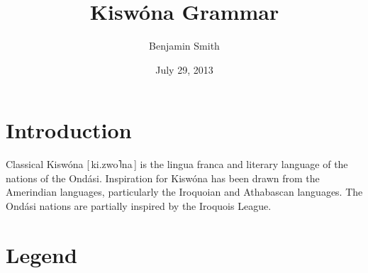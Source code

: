 \documentclass[11pt,a4paper,titlepage]{article}
\author{Benjamin Smith}
\title{Kiswóna Grammar}
\date{July 29, 2013}
\newcommand\phone[1]{[\,#1\,]}
\newcommand\hightone{˥}
\begin{document}
	

	\tableofcontents
	
	\newpage
	
	\section{Introduction}
		Classical Kiswóna \phone{ki.zwo\hightone na} is the lingua franca and literary language of the nations of the Ondási. Inspiration for Kiswóna has been drawn from the Amerindian languages, particularly the Iroquoian and Athabascan languages. The Ondási nations are partially inspired by the Iroquois League.
	
	\section{Legend}
\end{document}
